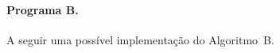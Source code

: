 \documentclass{article}
\begin{document}
\pagebreak
\paragraph{Programa B.} A seguir uma possível implementação 
do Algoritmo~B.





\end{document}
